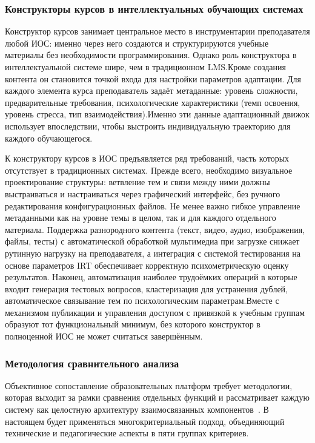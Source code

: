 \subsubsection{Конструкторы курсов в интеллектуальных обучающих системах}

Конструктор курсов занимает центральное место в инструментарии
преподавателя любой ИОС: именно через него создаются и
структурируются учебные материалы без необходимости
программирования. Однако роль конструктора в интеллектуальной
системе шире, чем в традиционном LMS.Кроме
создания контента он становится точкой входа для настройки
параметров адаптации. Для каждого элемента курса преподаватель
задаёт метаданные: уровень сложности, предварительные требования,
психологические характеристики (темп освоения, уровень стресса,
тип взаимодействия).Именно эти данные адаптационный движок
использует впоследствии, чтобы выстроить индивидуальную
траекторию для каждого обучающегося.

К конструктору курсов в ИОС предъявляется ряд требований,
часть которых отсутствует в традиционных системах. Прежде
всего, необходимо визуальное проектирование структуры: ветвление
тем и связи между ними должны выстраиваться и настраиваться через графический
интерфейс, без ручного редактирования конфигурационных файлов.
Не менее важно гибкое управление метаданными как
на уровне темы в целом, так и для каждого отдельного
материала. Поддержка разнородного контента (текст, видео,
аудио, изображения, файлы, тесты) с автоматической обработкой
мультимедиа при загрузке снижает рутинную нагрузку на
преподавателя, а интеграция с системой тестирования на основе
параметров IRT обеспечивает корректную психометрическую оценку
результатов. Наконец, автоматизация наиболее трудоёмких
операций в которые входит генерация тестовых вопросов, кластеризация для
устранения дублей, автоматическое связывание тем по
психологическим параметрам.Вместе с механизмом публикации
и управления доступом с привязкой к учебным группам образуют
тот функциональный минимум, без которого конструктор в
полноценной ИОС не может считаться завершённым.

\subsubsection{Методология сравнительного анализа}

Объективное сопоставление образовательных платформ требует
методологии, которая выходит за рамки сравнения отдельных
функций и рассматривает каждую систему как целостную
архитектуру взаимосвязанных компонентов~\cite{brusilovsky2007usermodels}.
В настоящем будет применяться многокритериальный подход,
объединяющий технические и педагогические аспекты в пяти
группах критериев.

